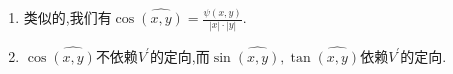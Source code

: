 \begin{remark}{}{}
	\begin{enumerate}
		\item 类似的,我们有$\cos\widehat{\left(x,y\right)}=\frac{\psi\left(x,y\right)}{\left|x\right|\cdot\left|y\right|}$.
		\item $\cos\widehat{\left(x,y\right)}$不依赖$V^{\prime}$的定向,而$\sin\widehat{\left(x,y\right)},\tan\widehat{\left(x,y\right)}$依赖$V^{\prime}$的定向.
	\end{enumerate}
\end{remark}




























